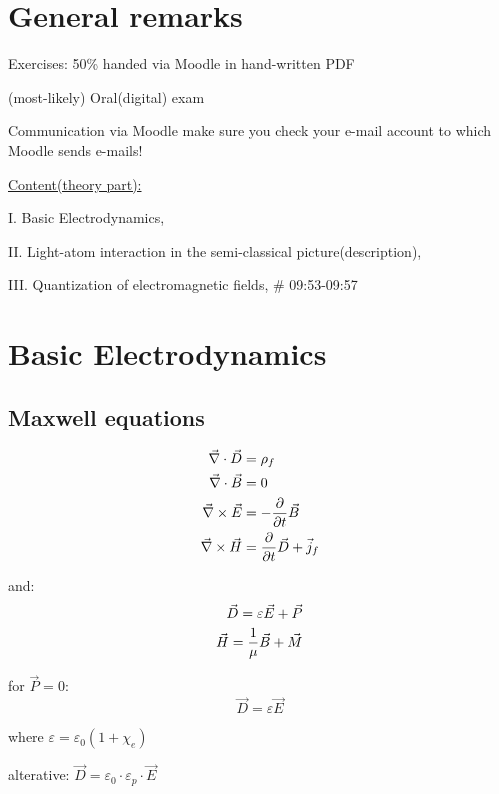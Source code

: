 


    \setcounter{section}{-1}
    \section{General remarks}
    Exercises: 50\% handed via Moodle in hand-written PDF

    (most-likely) Oral(digital) exam

    Communication via Moodle make sure you check your e-mail account to which Moodle sends e-mails!

    \underline{Content(theory part):}

    I. Basic Electrodynamics,

    II. Light-atom interaction in the semi-classical picture(description),

    III. Quantization of electromagnetic fields,
    \# 09:53-09:57

    \section{Basic Electrodynamics}
    \setcounter{subsection}{-1}
    \subsection{Maxwell equations}

    $$
    \begin{aligned}
        \vec{\nabla} \cdot \vec{D} &= \rho_f \nonumber \\ 
        \vec{\nabla} \cdot \vec{B} &= 0 \nonumber \\ 
        \vec{\nabla} \times \vec{E} &= - \frac{\partial}{\partial t} \vec{B} \nonumber \\ 
        \vec{\nabla} \times \vec{H} &= \frac{\partial}{\partial t} \vec{D} + \vec{j}_f \nonumber \\ 
    \end{aligned}
    $$

    and:
    $$
    \begin{aligned}
        \vec{D} = \varepsilon \vec{E} + \vec{P} \nonumber \\ 
        \vec{H} = \frac{1}{\mu} \vec{B} + \vec{M} \nonumber \\ 
    \end{aligned}
    $$

    for $\vec{P} = 0$:
    $$
    \vec{D} = \varepsilon \vec{E}
    $$

    where $\varepsilon = \varepsilon_0\left(1+\chi_e\right)$

    alterative: $\vec{D} = \varepsilon_0 \cdot \varepsilon_p \cdot \vec{E} $

